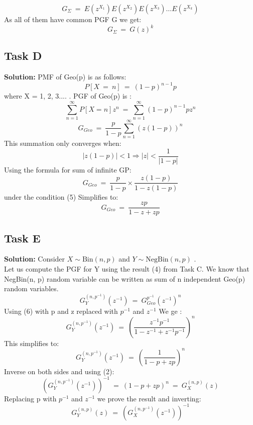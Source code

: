 \documentclass[12pt]{article}
\begin{document}
\[G_{\Sigma}\ =\ E(z^{X_1})E(z^{X_2})E(z^{X_3})\dots E(z^{X_k})\]
As all of them have common PGF G we get:
\begin{equation}
    G_{\Sigma}\ =\ G(z)^k
\end{equation}

\subsection{Task D}
\textbf{Solution: } \newline
PMF of Geo(p) is as follows:
\[P[X\ =\ n]\ =\ (1-p)^{n-1}p\]
where X = {1, 2, 3....} . PGF of Geo(p) is :
\[\sum_{n=1}^{\infty}P[X=n]z^n\ =\ \sum_{n=1}^{\infty}(1-p)^{n-1}pz^n\]
\[G_{Geo}\ =\ \frac{p}{1-p}\sum_{n=1}^{\infty}(z(1-p))^n\]
This summation only converges when:
\begin{equation}
    |z(1-p)|<1 \Rightarrow |z|<\frac{1}{|1-p|}
\end{equation}
Using the formula for sum of infinite GP:
\[G_{Geo}\ =\ \frac{p}{1-p}\times\frac{z(1-p)}{1-z(1-p)}\]
under the condition (5) Simplifies to:
\begin{equation}
    G_{Geo}\ =\ \frac{zp}{1-z+zp}
\end{equation}

\subsection{Task E}
\textbf{Solution: } \newline
Consider $X \sim \text{Bin}(n, p)$ and $Y \sim \text{NegBin}(n, p)$ .\\
Let us compute the PGF for Y using the result (4) from Task C. We know that NegBin(n, p) random variable can be written as sum of n independent Geo(p) random variables.
\[G_{Y}^{(n,p^{-1})}(z^{-1})\ =\ G_{Geo}^{p^{-1}}(z^{-1})^{n}\]
Using (6) with p and z replaced with $p^{-1}$ and $z^{-1}$ We ge :
\[G_{Y}^{(n,p^{-1})}(z^{-1})\ =\ \left(\frac{z^{-1}p^{-1}}{1-z^{-1}+z^{-1}p^{-1}}\right)^{n}\]
This simplifies to:
\[G_{Y}^{(n,p^{-1})}(z^{-1})\ =\ \left(\frac{1}{1-p+zp}\right)^{n}\]
Inverse on both sides and using (2):
\[\left(G_{Y}^{(n,p^{-1})}(z^{-1})\right)^{-1}\ =\ (1-p+zp)^n\ =\ G_{X}^{(n,p)}(z)\]
Replacing p with $p^{-1}$ and $z^{-1}$ we prove the result and inverting:
\begin{equation}
    G_{Y}^{(n,p)}(z)\ =\ \left(G_{X}^{(n,p^{-1})}(z^{-1})\right)^{-1}
\end{equation}
\end{document}
